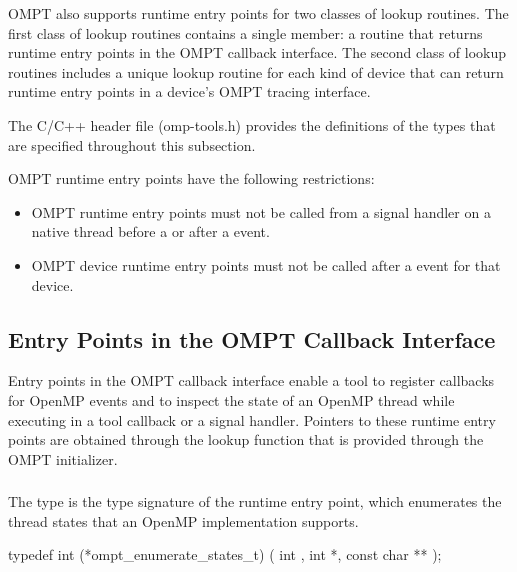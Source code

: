 OMPT also supports runtime entry points for two classes of lookup routines. The 
first class of lookup routines contains a single member: a routine that returns 
runtime entry points in the OMPT callback interface. The second class of lookup 
routines includes a unique lookup routine for each kind of device that can return 
runtime entry points in a device's OMPT tracing interface.

The C/C++ header file (omp-tools.h) provides the definitions of
the types that are specified throughout this subsection.

\restrictions

OMPT runtime entry points have the following restrictions:

\begin{itemize}
\item OMPT runtime entry points must not be called from a signal handler
      on a native thread before a  or after a 
       event.
\item OMPT device runtime entry points must not be called after a 
       event for that device.
\end{itemize}



\subsection{Entry Points in the OMPT Callback Interface}
\label{sec:ompt-callback-entry-points}

Entry points in the OMPT callback interface enable a tool to register callbacks 
for OpenMP events and to inspect the state of an OpenMP thread while executing 
in a tool callback or a signal handler. Pointers to these runtime entry points 
are obtained through the lookup function that is provided through the OMPT initializer.

\subsubsection{}
\label{sec:ompt_enumerate_states_t}
\label{sec:ompt_enumerate_states}

\summary
The  type is the type signature of 
the  runtime entry point, which
enumerates the thread states that an OpenMP implementation supports.

\format
\begin{ccppspecific}
\begin{omptInquiry}
typedef int (*ompt_enumerate_states_t) (
  int ,
  int *,
  const char **
);
\end{omptInquiry}
\end{ccppspecific}

